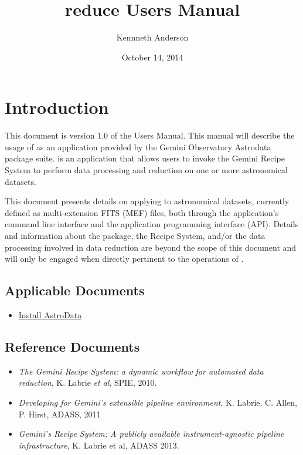 \documentclass[letterpaper,10pt,english]{sphinxmanual}
\title{reduce Users Manual}
\date{October 14, 2014}
\author{Kennneth Anderson}
\begin{document}
\maketitle
\tableofcontents
{}\label{index-latex::doc}



\chapter{Introduction}
\label{intro:introduction}\label{intro:reduce-users-manual}\label{intro::doc}
This document is version 1.0 of the  Users Manual. This manual will
describe the usage of  as an application provided by the Gemini Observatory
Astrodata package suite.  is an application that allows users to invoke the
Gemini Recipe System to perform data processing and reduction on one or more
astronomical datasets.

This document presents details on applying  to astronomical datasets,
currently defined as multi-extension FITS (MEF) files, both through the application's
command line interface and the application programming interface (API). Details and
information about the  package, the Recipe System, and/or the data
processing involved in data reduction are beyond the scope of this document and
will only be engaged when directly pertinent to the operations of .


\section{Applicable Documents}
\label{intro:applicable-documents}\begin{itemize}
\item {} 
\href{http://gdpsg.wikis-internal.gemini.edu/index.php/InstallAstroData}{Install AstroData}

\end{itemize}


\section{Reference Documents}
\label{intro:reference-documents}\begin{itemize}
\item {} 
\emph{The Gemini Recipe System: a dynamic workflow for automated data reduction},
K. Labrie \emph{et al}, SPIE, 2010.

\item {} 
\emph{Developing for Gemini’s extensible pipeline environment}, K. Labrie,
C. Allen, P. Hirst, ADASS, 2011

\item {} 
\emph{Gemini's Recipe System; A publicly available instrument-agnostic pipeline
infrastructure}, K. Labrie et al, ADASS 2013.

\end{itemize}
\end{document}
